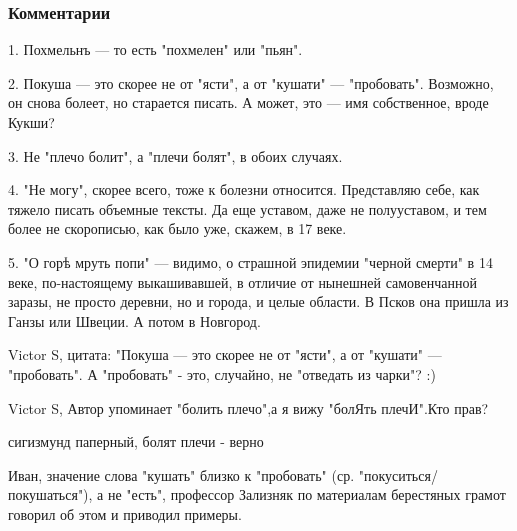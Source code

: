  
 
 
 
 

\subsubsection{Комментарии}

\begin{itemize}

1. Похмельнъ — то есть "похмелен" или "пьян".

2. Покуша — это скорее не от "ясти", а от "кушати" — "пробовать". Возможно, он снова болеет, но старается писать. А может, это — имя собственное, вроде Кукши?

3. Не "плечо болит", а "плечи болят", в обоих случаях.

4. "Не могу", скорее всего, тоже к болезни относится. Представляю себе, как тяжело писать объемные тексты. Да еще уставом, даже не полууставом, и тем более не скорописью, как было уже, скажем, в 17 веке.

5. "О горѣ мруть попи" — видимо, о страшной эпидемии "черной смерти" в 14 веке,
по-настоящему выкашивавшей, в отличие от нынешней самовенчанной заразы, не
просто деревни, но и города, и целые области. В Псков она пришла из Ганзы или
Швеции. А потом в Новгород.


Victor S, цитата: "Покуша — это скорее не от "ясти", а от "кушати" —
"пробовать". А "пробовать" - это, случайно, не "отведать из чарки"? :)


Victor S, Автор упоминает "болить плечо",а я вижу "болЯть плечИ".Кто прав?


сигизмунд паперный, болят плечи - верно


Иван, значение слова "кушать" близко к "пробовать" (ср.
"покуситься/покушаться"), а не "есть", профессор Зализняк по
материалам берестяных грамот говорил об этом и приводил
примеры.


\end{itemize}
